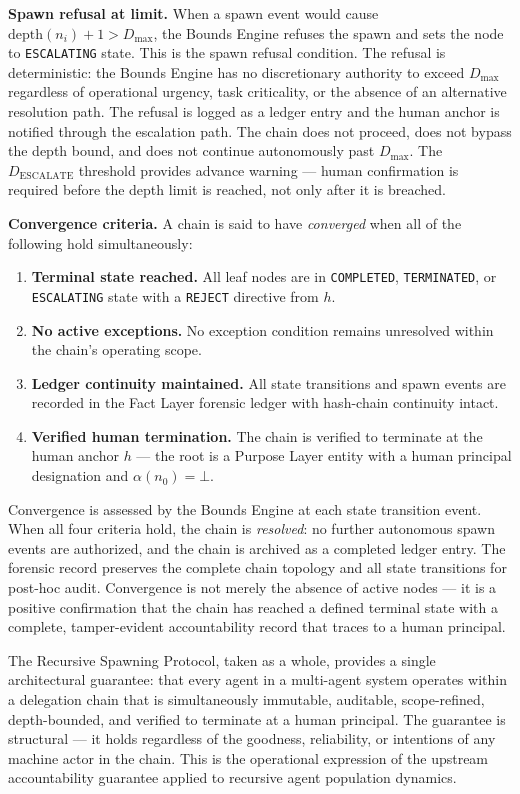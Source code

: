\medskip
\noindent\textbf{Spawn refusal at limit.} When a spawn event would cause $\text{depth}(n_i) + 1 > D_{\max}$, the Bounds Engine refuses the spawn and sets the node to \texttt{ESCALATING} state. This is the spawn refusal condition. The refusal is deterministic: the Bounds Engine has no discretionary authority to exceed $D_{\max}$ regardless of operational urgency, task criticality, or the absence of an alternative resolution path. The refusal is logged as a ledger entry and the human anchor is notified through the escalation path. The chain does not proceed, does not bypass the depth bound, and does not continue autonomously past $D_{\max}$. The $D_{\text{ESCALATE}}$ threshold provides advance warning --- human confirmation is required before the depth limit is reached, not only after it is breached.

\medskip
\noindent\textbf{Convergence criteria.} A chain is said to have \emph{converged} when all of the following hold simultaneously:

\begin{enumerate}
    \item[(C1)] \textbf{Terminal state reached.} All leaf nodes are in \texttt{COMPLETED}, \texttt{TERMINATED}, or \texttt{ESCALATING} state with a \texttt{REJECT} directive from $h$.

    \item[(C2)] \textbf{No active exceptions.} No exception condition remains unresolved within the chain's operating scope.

    \item[(C3)] \textbf{Ledger continuity maintained.} All state transitions and spawn events are recorded in the Fact Layer forensic ledger with hash-chain continuity intact.

    \item[(C4)] \textbf{Verified human termination.} The chain is verified to terminate at the human anchor $h$ --- the root is a Purpose Layer entity with a human principal designation and $\alpha(n_0) = \bot$.
\end{enumerate}

Convergence is assessed by the Bounds Engine at each state transition event. When all four criteria hold, the chain is \emph{resolved}: no further autonomous spawn events are authorized, and the chain is archived as a completed ledger entry. The forensic record preserves the complete chain topology and all state transitions for post-hoc audit. Convergence is not merely the absence of active nodes --- it is a positive confirmation that the chain has reached a defined terminal state with a complete, tamper-evident accountability record that traces to a human principal.

\medskip
The Recursive Spawning Protocol, taken as a whole, provides a single architectural guarantee: that every agent in a multi-agent system operates within a delegation chain that is simultaneously immutable, auditable, scope-refined, depth-bounded, and verified to terminate at a human principal. The guarantee is structural --- it holds regardless of the goodness, reliability, or intentions of any machine actor in the chain. This is the operational expression of the upstream \bxthree{} accountability guarantee applied to recursive agent population dynamics.
